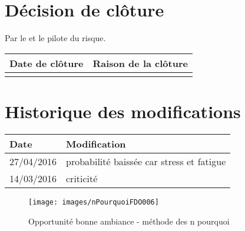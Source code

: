 \section*{Décision de clôture}
Par le \CP{} et le pilote du risque.
\begin{table}[h]
\centering
	\begin{tabularx}{16.8cm}{|X|X|}
	\hline
	\rowcolor{gray!40} Date de clôture & Raison de la clôture \\
	\hline
	  & \\
	\hline
	\end{tabularx}
\end{table}

\section*{Historique des modifications}
\begin{table}[h]
\centering
	\begin{tabularx}{16.8cm}{|X|X|}
	\hline
	\rowcolor{gray!40} Date & Modification \\%
	\hline
	27/04/2016  & probabilité baissée car stress et fatigue \\
	\hline
	14/03/2016  & criticité \\
	\hline
	\end{tabularx}
\end{table}
\newpage


\begin{figure}
	\centering
	\texttt{[image: images/nPourquoiFDO006]}
	\caption{\label{opportunite bonne ambiance}Opportunité bonne ambiance - méthode des n pourquoi}
\end{figure}